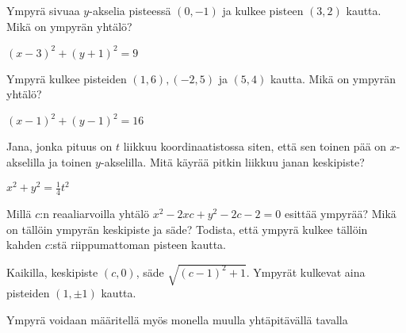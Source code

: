 \begin{tehtavasivu}
\begin{tehtava}
Ympyrä sivuaa $y$-akselia pisteessä $(0, -1)$ ja kulkee pisteen $(3, 2)$ kautta. Mikä on ympyrän yhtälö?
\begin{vastaus}
$(x-3)^2+(y+1)^2=9$
\end{vastaus}
\end{tehtava}

\begin{tehtava}
Ympyrä kulkee pisteiden $(1, 6), (-2, 5)$ ja $(5, 4)$ kautta. Mikä on ympyrän yhtälö?
\begin{vastaus}
$(x-1)^2+(y-1)^2=16$
\end{vastaus}
\end{tehtava}

\begin{tehtava}
Jana, jonka pituus on $t$ liikkuu koordinaatistossa siten, että sen toinen pää on $x$-akselilla ja toinen $y$-akselilla. Mitä käyrää pitkin liikkuu janan keskipiste?
\begin{vastaus}
$x^2+y^2=\frac{1}{4}t^2$
\end{vastaus}
\end{tehtava}

\begin{tehtava}
Millä $c$:n reaaliarvoilla yhtälö $x^2-2xc+y^2-2c-2 = 0$ esittää ympyrää? Mikä on tällöin ympyrän keskipiste ja säde? Todista, että ympyrä kulkee tällöin kahden $c$:stä riippumattoman pisteen kautta.
\begin{vastaus}
Kaikilla, keskipiste $(c,0)$, säde $\sqrt{(c-1)^2+1}$. Ympyrät kulkevat aina pisteiden $(1,\pm 1)$ kautta.
\end{vastaus}
\end{tehtava}

\begin{tehtava}
Ympyrä voidaan määritellä myös monella muulla yhtäpitävällä tavalla
\begin{alakohdat}
\end{alakohdat}
\begin{vastaus}
\begin{alakohdat}
\end{alakohdat}
\end{vastaus}
\end{tehtava}

\end{tehtavasivu}